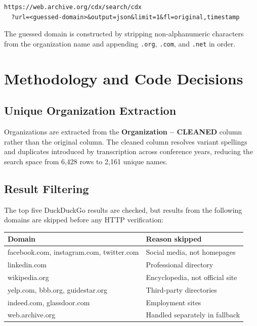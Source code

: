 \documentclass[12pt]{article}
\begin{document}
\begin{lstlisting}
https://web.archive.org/cdx/search/cdx
  ?url=<guessed-domain>&output=json&limit=1&fl=original,timestamp
\end{lstlisting}

The guessed domain is constructed by stripping non-alphanumeric characters
from the organization name and appending \texttt{.org}, \texttt{.com},
and \texttt{.net} in order.

\section{Methodology and Code Decisions}

\subsection{Unique Organization Extraction}

Organizations are extracted from the \textbf{Organization -- CLEANED} column
rather than the original column. The cleaned column resolves variant spellings
and duplicates introduced by transcription across conference years, reducing
the search space from 6,428 rows to 2,161 unique names.

\subsection{Result Filtering}

The top five DuckDuckGo results are checked, but results from the following
domains are skipped before any HTTP verification:

\begin{center}
\begin{tabular}{ll}
\toprule
Domain & Reason skipped \\
\midrule
facebook.com, instagram.com, twitter.com & Social media, not homepages \\
linkedin.com & Professional directory \\
wikipedia.org & Encyclopedia, not official site \\
yelp.com, bbb.org, guidestar.org & Third-party directories \\
indeed.com, glassdoor.com & Employment sites \\
web.archive.org & Handled separately in fallback \\
\bottomrule
\end{tabular}
\end{center}
\end{document}
